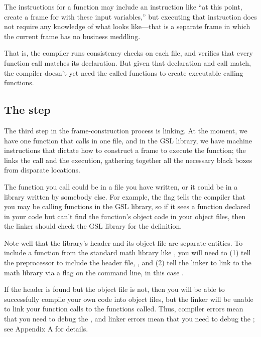 The instructions for a function may include an instruction like ``at this
point, create a frame for  with these input
variables,'' but executing that instruction does not require any knowledge
of what  looks like---that is a separate frame
in which the current frame has no business meddling.

That is, the compiler runs consistency checks on each file, and
verifies that every function call matches its declaration.  But given
that declaration and call match, the compiler doesn't yet need the
called functions to create executable calling functions.


\subsection{The  step}
The third step in the frame-construction process is linking. At the moment, we have one
function that calls  in one file, and in the
GSL library, we have machine instructions that dictate how to construct
a frame to execute the  function; the  links
the call and the execution, gathering together all the necessary black
boxes from disparate locations.

The function you call could be in a file you have written, or it could be
in a library written by somebody else.  For example, the 
flag tells the compiler that you may be calling functions in the GSL
library, so if it sees a function declared in your code but can't find
the function's object code in your object files, then the linker should check
the GSL library for the definition.

Note well that the library's header and its object file are separate
entities. To include a function from the standard math library like
, you will need to (1) tell the preprocessor to include the
header file, , and (2) tell the linker to link
to the math library via a  flag on the command line, in this case
.

If the header is found but the object file is not, then you
will be able to successfully compile your own code into object files,
but the linker will be unable to link your function calls to the
functions called. Thus, compiler errors mean that you need to debug the
, and linker errors mean that you need to debug the ; see Appendix A for details.

